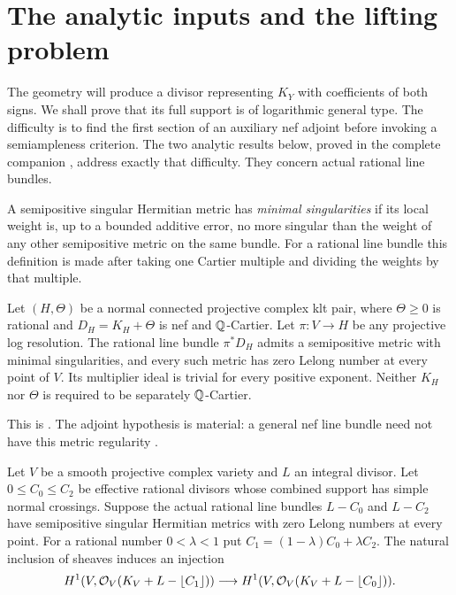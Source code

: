 \section{The analytic inputs and the lifting problem}\label{sec:analytic-inputs}

The geometry will produce a divisor representing $K_Y$ with coefficients
of both signs. We shall prove that its full support is of logarithmic
general type. The difficulty is to find the first section of an auxiliary
nef adjoint before invoking a semiampleness criterion. The two analytic
results below, proved in the complete companion \cite{OpenAIMetrics2026},
address exactly that difficulty. They concern actual rational line bundles.

A semipositive singular Hermitian metric has \emph{minimal singularities}
if its local weight is, up to a bounded additive error, no more singular
than the weight of any other semipositive metric on the same bundle.
For a rational line bundle this definition is made after taking one
Cartier multiple and dividing the weights by that multiple.

\begin{theorem}
\label{thm:adjoint-metric}
Let $(H,\Theta)$ be a normal connected projective complex klt pair,
where $\Theta\ge0$ is rational and $D_H=K_H+\Theta$ is nef and
$\mathbb Q$-Cartier. Let $\pi:V\to H$ be any projective log resolution.
The rational line bundle $\pi^*D_H$ admits a semipositive metric
with minimal singularities, and every such metric has zero Lelong
number at every point of $V$. Its multiplier ideal is trivial for
every positive exponent. Neither $K_H$ nor $\Theta$ is required
to be separately $\mathbb Q$-Cartier.
\end{theorem}

This is \cite[Theorem~1.1]{OpenAIMetrics2026}. The adjoint hypothesis is material:
a general nef line bundle need not have this metric regularity
\cite[Example~1.7]{DPS1994}.

\begin{theorem}
\label{thm:interior-injectivity}
Let $V$ be a smooth projective complex variety and $L$ an integral
divisor. Let $0\le C_0\le C_2$ be effective rational divisors whose
combined support has simple normal crossings. Suppose the actual
rational line bundles $L-C_0$ and $L-C_2$ have semipositive singular
Hermitian metrics with zero Lelong numbers at every point. For a
rational number $0<\lambda<1$ put $C_1=(1-\lambda)C_0+\lambda C_2$.
The natural inclusion of sheaves induces an injection
\[
 H^1(V,\mathcal O_V(K_V+L-\lfloor C_1\rfloor))
 \longrightarrow H^1(V,\mathcal O_V(K_V+L-\lfloor C_0\rfloor)).
\]
\end{theorem}

